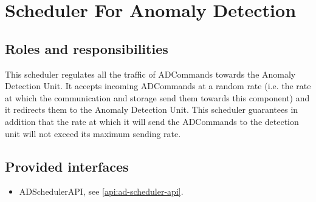 \section{Scheduler For Anomaly Detection}
\label{element:ad-scheduler}

\subsection{Roles and responsibilities}

\npar This scheduler regulates all the traffic of ADCommands towards the
Anomaly Detection Unit. It accepts incoming ADCommands at a random rate (i.e.
the rate at which the communication and storage send them towards this
component) and it redirects them to the Anomaly Detection Unit. This
scheduler guarantees in addition that the rate at which it will send the
ADCommands to the detection unit will not exceed its maximum sending rate.

\subsection{Provided interfaces}

\begin{itemize}
  \item ADSchedulerAPI, see \ref{api:ad-scheduler-api}.
\end{itemize}



